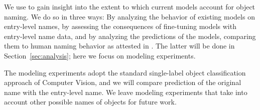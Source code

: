 

We use \mn to gain insight into the extent to which current models account for object naming.
We do so in three ways: By analyzing the behavior of existing models on entry-level names, by assessing the consequences of fine-tuning models with entry-level name data, and by analyzing the predictions of the models, comparing them to human naming behavior as attested in \mn.
The latter will be done in Section~\ref{sec:analysis}; here we focus on modeling experiments.

The modeling experiments adopt the standard single-label object classification approach of Computer Vision, and we will compare prediction of the original \vg name with the entry-level name.
We leave modeling experiments that take into account other possible names of objects for future work.

